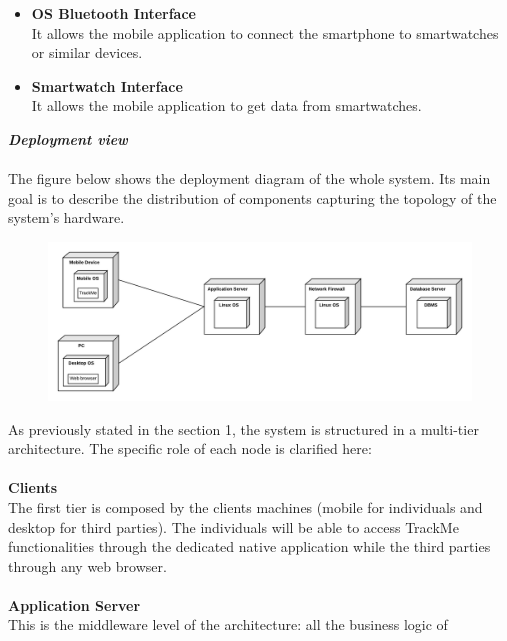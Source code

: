 \begin{legal}
\begin{itemize}
{\begin{itemize}
{						}\\
			\item{\textbf{OS Bluetooth Interface}\\
			It allows the mobile application to connect the smartphone to smartwatches or similar devices.
						}\\
			\item{\textbf{Smartwatch Interface}\\
			It allows the mobile application to get data from smartwatches.
						}\\
      	\end{itemize}
				}
		\end{itemize}

		\item \textit{\textbf{Deployment view}}\\\\
		The figure below shows the deployment diagram of the whole system. Its main goal is to describe the distribution of components capturing the topology of the
system's hardware.\\
		\begin{figure}[H]
		\includegraphics[width=\linewidth]{../images/design/DeploymentDiagram.png}\\
		\end{figure}
		As previously stated in the section 1, the system is structured in a multi-tier architecture. The specific role of each node is clarified here:\\\\
		\textbf{Clients}\\
The first tier is composed by the clients machines (mobile for individuals and desktop for third parties). The individuals will be able to access TrackMe functionalities through the dedicated native application while the third parties through any web browser.\\\\
		\textbf{Application Server}\\
This is the middleware level of the architecture: all the business logic of

\end{legal}
